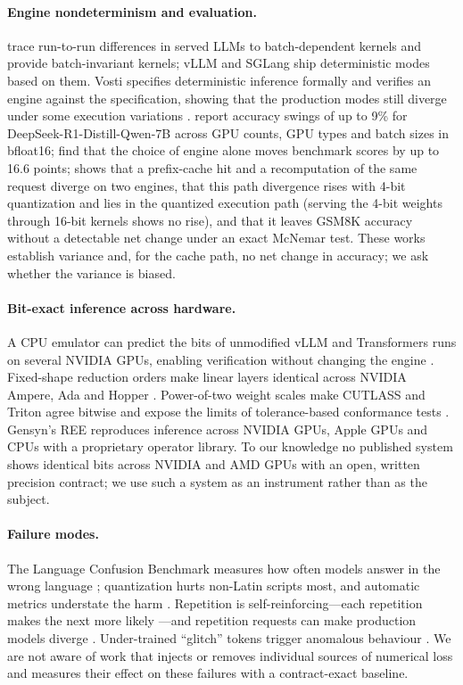 \documentclass[11pt]{article}
\begin{document}
\paragraph{Engine nondeterminism and evaluation.}
\citet{he2025} trace run-to-run differences in served LLMs to batch-dependent kernels and provide batch-invariant kernels;
vLLM and SGLang ship deterministic modes based on them. Vosti specifies deterministic inference formally and verifies an
engine against the specification, showing that the production modes still diverge under some execution variations
\citep{qin2026}. \citet{yuan2025} report accuracy swings of up to 9\% for DeepSeek-R1-Distill-Qwen-7B across GPU counts,
GPU types and batch sizes in bfloat16; \citet{pape2026} find that the choice of engine alone moves benchmark scores by up
to 16.6 points; \citet{patodiya2026} shows that a prefix-cache hit and a recomputation of the same request diverge on two
engines, that this path divergence rises with 4-bit quantization and lies in the quantized execution path (serving the
4-bit weights through 16-bit kernels shows no rise), and that it leaves GSM8K accuracy without a detectable net change
under an exact McNemar test. These works establish variance and, for the cache path, no net change in accuracy; we ask
whether the variance is biased.

\paragraph{Bit-exact inference across hardware.}
A CPU emulator can predict the bits of unmodified vLLM and Transformers runs on several NVIDIA GPUs, enabling verification
without changing the engine \citep{bitexact2026}. Fixed-shape reduction orders make linear layers identical across NVIDIA
Ampere, Ada and Hopper \citep{cooper2026}. Power-of-two weight scales make CUTLASS and Triton agree bitwise and expose the
limits of tolerance-based conformance tests \citep{chen2026}. Gensyn's REE reproduces inference across NVIDIA GPUs, Apple
GPUs and CPUs with a proprietary operator library. To our knowledge no published system shows identical bits across NVIDIA
and AMD GPUs with an open, written precision contract; we use such a system as an instrument rather than as the subject.

\paragraph{Failure modes.}
The Language Confusion Benchmark measures how often models answer in the wrong language \citep{marchisio2024a};
quantization hurts non-Latin scripts most, and automatic metrics understate the harm \citep{marchisio2024b}. Repetition is
self-reinforcing---each repetition makes the next more likely \citep{xu2022}---and repetition requests can make production
models diverge \citep{nasr2023}. Under-trained ``glitch'' tokens trigger anomalous behaviour \citep{land2024}. We are not
aware of work that injects or removes individual sources of numerical loss and measures their effect on these failures
with a contract-exact baseline.
\end{document}
